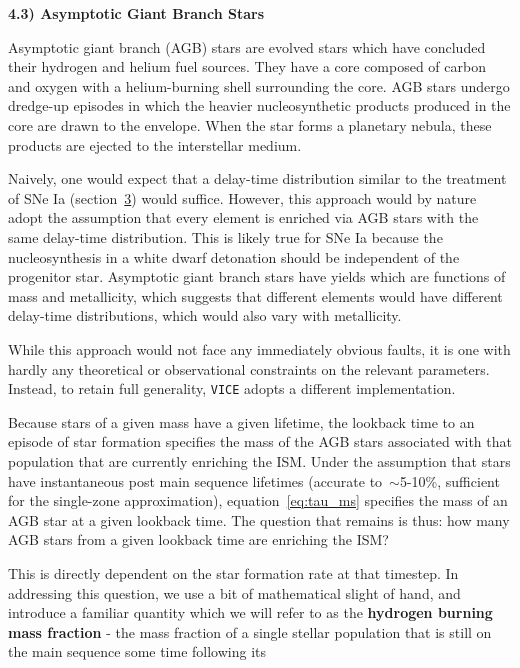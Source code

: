 \documentclass{report}
\begin{document}
\null\par\noindent
\hypertarget{sec:agb}{\textbf{4.3) Asymptotic Giant Branch Stars}} 
\par\noindent
Asymptotic giant branch (AGB) stars are evolved stars which have concluded 
their hydrogen and helium fuel sources. They have a core composed of carbon 
and oxygen with a helium-burning shell surrounding the core. AGB stars undergo 
dredge-up episodes in which the heavier nucleosynthetic products produced in 
the core are drawn to the envelope. When the star forms a planetary nebula, 
these products are ejected to the interstellar medium. 
\par
Naively, one would expect that a delay-time distribution similar to the 
treatment of SNe Ia (section~\hyperlink{sec:sneia}{3}) would suffice. However, 
this approach would by nature adopt the assumption that every element is 
enriched via AGB stars with the same delay-time distribution. This is likely 
true for SNe Ia because the nucleosynthesis in a white dwarf detonation should 
be independent of the progenitor star. Asymptotic giant branch stars have 
yields which are functions of mass and metallicity, which suggests that 
different elements would have different delay-time distributions, which would 
also vary with metallicity. 
\par
While this approach would not face any immediately obvious faults, it is one 
with hardly any theoretical or observational constraints on the relevant 
parameters. Instead, to retain full generality, \texttt{VICE} adopts a 
different implementation. 
\par
Because stars of a given mass have a given lifetime, the lookback time to an 
episode of star formation specifies the mass of the AGB stars associated with 
that population that are currently enriching the ISM. Under the assumption 
that stars have instantaneous post main sequence lifetimes (accurate 
to~$\sim$5-10\%, sufficient for the single-zone approximation), 
equation~\ref{eq:tau_ms} specifies the mass of an AGB star at a given lookback 
time. The question that remains is thus: how many AGB stars from a given 
lookback time are enriching the ISM? 
\par
This is directly dependent on the star formation rate at that timestep. In 
addressing this question, we use a bit of mathematical slight of hand, and 
introduce a familiar quantity which we will refer to as the 
\textbf{hydrogen burning mass fraction} - the mass fraction of a single 
stellar population that is still on the main sequence some time following its 
\end{document}

